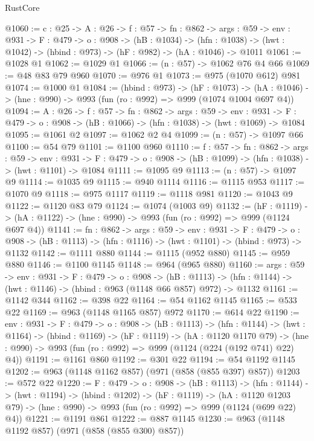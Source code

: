 \begin{lexlean}{RustCore}
\begin{coremodule}
@1060 := {c : @25} ->
  {A : @26} ->
  {f : @57} ->
  {fn : @862} ->
  {args : @59} ->
  {env : @931} ->
  {F : @479} ->
  {o : @908} ->
  (hB : @1034) ->
  (hfn : @1038) -> (hwt : @1042) -> (hbind : @973) -> (hF : @982) -> (hA : @1046) -> @1011
@1061 := @1028 @1
@1062 := @1029 @1
@1066 := (n : @57) -> @1062 @76 @4 @66
@1069 := @48 @83 @79 @960
@1070 := @976 @1
@1073 := @975 (@1070 @612) @981
@1074 := @1000 @1
@1084 := (hbind : @973) ->
  (hF : @1073) ->
  (hA : @1046) -> (hne : @990) -> @993 (fun (ro : @992) => @999 (@1074 @1004 @697 @4))
@1094 := {A : @26} ->
  {f : @57} ->
  {fn : @862} ->
  {args : @59} ->
  {env : @931} ->
  {F : @479} -> {o : @908} -> (hB : @1066) -> (hfn : @1038) -> (hwt : @1069) -> @1084
@1095 := @1061 @2
@1097 := @1062 @2 @4
@1099 := (n : @57) -> @1097 @66
@1100 := @54 @79
@1101 := @1100 @960
@1110 := {f : @57} ->
  {fn : @862} ->
  {args : @59} ->
  {env : @931} ->
  {F : @479} -> {o : @908} -> (hB : @1099) -> (hfn : @1038) -> (hwt : @1101) -> @1084
@1111 := @1095 @9
@1113 := (n : @57) -> @1097 @9
@1114 := @1035 @9
@1115 := @940 @1114
@1116 := @1115 @953
@1117 := @1070 @9
@1118 := @975 @1117
@1119 := @1118 @981
@1120 := @1043 @9
@1122 := @1120 @83 @79
@1124 := @1074 (@1003 @9)
@1132 := (hF : @1119) ->
  (hA : @1122) -> (hne : @990) -> @993 (fun (ro : @992) => @999 (@1124 @697 @4))
@1141 := {fn : @862} ->
  {args : @59} ->
  {env : @931} ->
  {F : @479} ->
  {o : @908} -> (hB : @1113) -> (hfn : @1116) -> (hwt : @1101) -> (hbind : @973) -> @1132
@1142 := @1111 @880
@1144 := @1115 (@952 @880)
@1145 := @959 @880
@1146 := @1100 @1145
@1148 := @964 (@965 @880)
@1160 := {args : @59} ->
  {env : @931} ->
  {F : @479} ->
  {o : @908} ->
  (hB : @1113) -> (hfn : @1144) -> (hwt : @1146) -> (hbind : @963 (@1148 @66 @857) @972) -> @1132
@1161 := @1142 @344
@1162 := @398 @22
@1164 := @54 @1162 @1145
@1165 := @533 @22
@1169 := @963 (@1148 @1165 @857) @972
@1170 := @614 @22
@1190 := {env : @931} ->
  {F : @479} ->
  {o : @908} ->
  (hB : @1113) ->
  (hfn : @1144) ->
  (hwt : @1164) ->
  (hbind : @1169) ->
  (hF : @1119) ->
  (hA : @1120 @1170 @79) ->
  (hne : @990) -> @993 (fun (ro : @992) => @999 (@1124 (@224 (@192 @741) @22) @4))
@1191 := @1161 @860
@1192 := @301 @22
@1194 := @54 @1192 @1145
@1202 := @963 (@1148 @1162 @857) (@971 (@858 (@855 @397) @857))
@1203 := @572 @22
@1220 := {F : @479} ->
  {o : @908} ->
  (hB : @1113) ->
  (hfn : @1144) ->
  (hwt : @1194) ->
  (hbind : @1202) ->
  (hF : @1119) ->
  (hA : @1120 @1203 @79) -> (hne : @990) -> @993 (fun (ro : @992) => @999 (@1124 (@699 @22) @4))
@1221 := @1191 @861
@1222 := @887 @1145
@1230 := @963 (@1148 @1192 @857) (@971 (@858 (@855 @300) @857))

\end{coremodule}
\end{lexlean}
